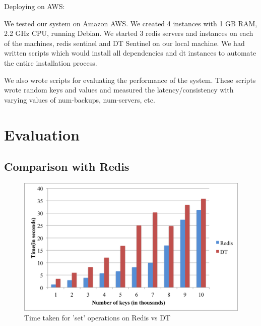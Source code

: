 \documentclass[10pt,twocolumn,letterpaper]{article}
\begin{document}
Deploying on AWS:

We tested our system on Amazon AWS. We created 4 instances with 1 GB RAM, 2.2 GHz CPU, running Debian. We started 3 redis servers and instances on each of the machines, redis sentinel  and DT Sentinel on our local machine. We had written scripts which would install all dependencies and dt instances to automate the entire installation process.

We also wrote scripts for evaluating the performance of the system. These scripts wrote random keys and values and measured the latency/consistency with varying values of num-backups, num-servers, etc.


\section{Evaluation} \label{evaluation}

\subsection{Comparison with Redis}
\begin{figure}[hbt]
 \centering
 \includegraphics[scale=0.36]{bar_graph}
 \caption{Time taken for 'set' operations on Redis vs DT}
 \label{redisvsDT}
\end{figure}
\end{document}
